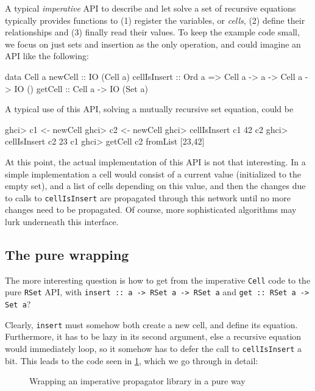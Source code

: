 \documentclass[manuscript,anonymous,screen,acmsmall]{acmart}
\begin{document}
A typical \emph{imperative} API to describe and let solve a set of recursive equations typically provides functions to (1) register the variables, or \emph{cells}, (2) define their relationships and (3) finally read their values. To keep the example code small, we focus on just sets and insertion as the only operation, and could imagine an API like the following:
\begin{code}
data Cell a
newCell       ::  IO (Cell a)
cellIsInsert  ::  Ord a => Cell a -> a -> Cell a -> IO ()
getCell       ::  Cell a -> IO (Set a)
\end{code}

A typical use of this API, solving a mutually recursive set equation, could be
\begin{code}
ghci> c1 <- newCell
ghci> c2 <- newCell
ghci> cellIsInsert c1 42 c2
ghci> cellIsInsert c2 23 c1
ghci> getCell c2
fromList [23,42]
\end{code}

At this point, the actual implementation of this API is not that interesting. In a simple implementation a cell would consist of a current value (initialized to the empty set), and a list of cells depending on this value, and then the changes due to calls to \verb|cellIsInsert| are propagated through this network until no more changes need to be propagated. Of course, more sophisticated algorithms may lurk underneath this interface.

\subsection{The pure wrapping}

The more interesting question is how to get from the imperative \verb|Cell| code to the pure \verb|RSet| API, with \verb|insert :: a -> RSet a -> RSet a| and \verb|get :: RSet a -> Set a|?

Clearly, \verb|insert| must somehow both create a new cell, and define its equation.
Furthermore, it has to be lazy in its second argument, else a recursive equation would immediately loop, so it somehow has to defer the call to \verb|cellIsInsert| a bit. This leads to the code seen in \cref{fig:wrap}, which we go through in detail:

\begin{figure}
\raggedright
{}
\caption{Wrapping an imperative propagator library in a pure way}\label{fig:wrap}
\end{figure}
\end{document}
